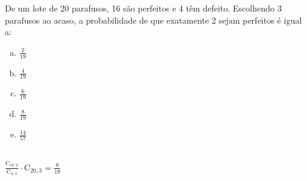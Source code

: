 \begin{ex}
 De um lote de 20 parafusos, 16 são perfeitos e 4 têm defeito. Escolhendo 3 parafusos ao acaso, a probabilidade de que exatamente 2 sejam perfeitos é igual a:
    \begin{enumerate}[(a)]
    \item $\frac{2}{19}$
    \item $\frac{4}{19}$
    \item $\frac{6}{19}$
    \item $\frac{8}{19}$
    \item $\frac{14}{57}$
    \end{enumerate}
    \begin{sol}
        \phantom{A} \\
    $\frac{\mathrm{C}_{{16},2}}{\mathrm{C}_{{4},1}}\cdot{\mathrm{C}_{{20},3}} = \frac{8}{19}$
    
    \end{sol}
    
\end{ex}